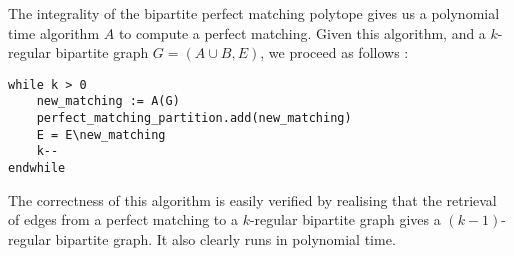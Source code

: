 \documentclass{scrartcl}
\newcommand\1{\mathbf{1}}
\begin{document}
The integrality of the bipartite perfect matching polytope gives us a polynomial time algorithm $A$ to compute a perfect matching. Given this algorithm, and a $k$-regular bipartite graph $G = (A \cup B,E)$, we proceed as follows :

\begin{verbatim}
while k > 0
    new_matching := A(G) 
    perfect_matching_partition.add(new_matching)
    E = E\new_matching
    k--
endwhile
\end{verbatim}

The correctness of this algorithm is easily verified by realising that the retrieval of edges from a perfect matching to a $k$-regular bipartite graph gives a $(k-1)$-regular bipartite graph. It also clearly runs in polynomial time.
\end{document}
